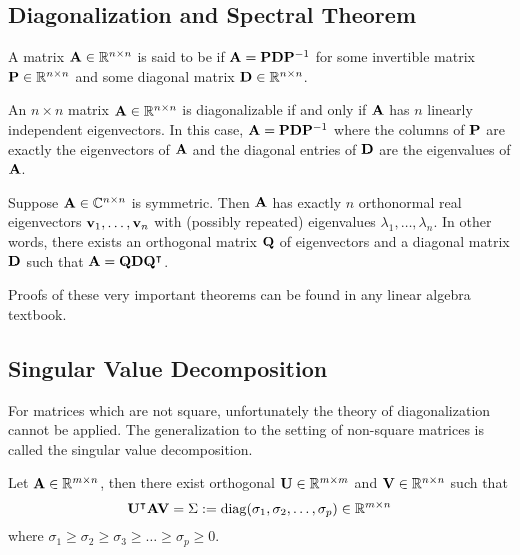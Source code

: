 \subsection{Diagonalization and Spectral Theorem}


A matrix $\MA \in \mathbb R^{n \times n}$ is said to be  if $\MA = \MP\MD\MP^{-1}$ for some invertible matrix $\MP \in \mathbb R^{n \times n}$ and some diagonal matrix $\MD \in \mathbb R^{n \times n}$. 


\begin{theorem}
An $n \times n$ matrix $\MA \in \mathbb R^{n \times n}$ is diagonalizable if and only if $\MA$ has $n$ linearly independent eigenvectors. In this case, 
$\MA = \MP\MD\MP^{-1}$
where the columns of $\MP$ are exactly the eigenvectors of $\MA$ and the diagonal entries of $\MD$ are the eigenvalues of $\MA$. 
\end{theorem}

\begin{theorem}\label{thm-spec}
Suppose $\MA \in \C^{n \times n}$ is symmetric. Then $\MA$ has exactly $n$ orthonormal real eigenvectors $\vv_1, \ldots, \vv_n$ with (possibly repeated) eigenvalues $\lambda_1, \ldots, \lambda_n$. In other words, there exists an orthogonal matrix $\MQ$ of eigenvectors and a diagonal matrix $\MD$ such that 
$\MA = \MQ\MD\MQ^\intercal$.
\end{theorem}

Proofs of these very important theorems can be found in any linear algebra textbook.

\subsection{Singular Value Decomposition}

For matrices which are not square, unfortunately the theory of diagonalization cannot be applied. The generalization to the setting of non-square matrices is called the singular value decomposition.

\begin{theorem}
Let $\MA \in \R^{m \times n}$, then there exist orthogonal $\MU \in \R^{m \times m}$ and $\MV \in \R^{n \times n}$ such that 
$$\MU^\intercal \MA \MV = \bSigma := \diag(\sigma_1, \sigma_2, \ldots, \sigma_p) \in \mathbb R^{m \times n}$$
where $\sigma_1 \geq \sigma_2 \geq \sigma_3 \geq \ldots \geq \sigma_p \geq 0.$
\end{theorem}

